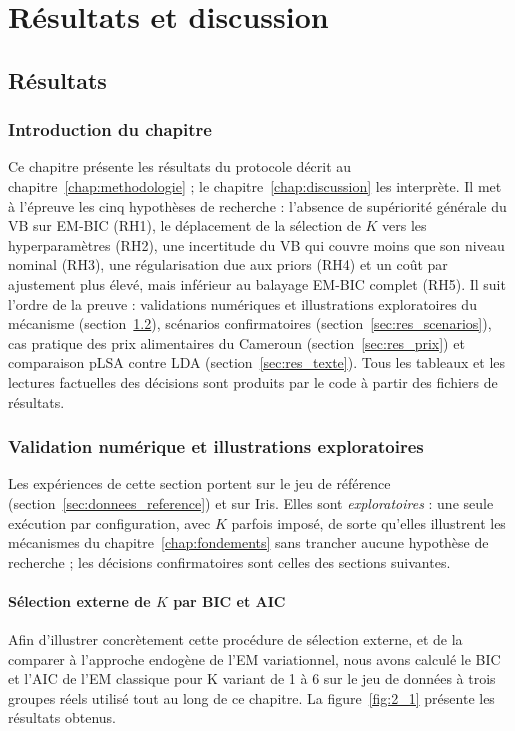 \part{Résultats et discussion}

\chapter{Résultats}\label{chap:resultats}
\section{Introduction du chapitre}\label{sec:intro_resultats}
Ce chapitre présente les résultats du protocole décrit au chapitre~\ref{chap:methodologie} ; le chapitre~\ref{chap:discussion} les interprète. Il met à l'épreuve les cinq hypothèses de recherche : l'absence de supériorité générale du VB sur EM-BIC (RH1), le déplacement de la sélection de $K$ vers les hyperparamètres (RH2), une incertitude du VB qui couvre moins que son niveau nominal (RH3), une régularisation due aux priors (RH4) et un coût par ajustement plus élevé, mais inférieur au balayage EM-BIC complet (RH5). Il suit l'ordre de la preuve : validations numériques et illustrations exploratoires du mécanisme (section~\ref{sec:res_illustrations}), scénarios confirmatoires (section~\ref{sec:res_scenarios}), cas pratique des prix alimentaires du Cameroun (section~\ref{sec:res_prix}) et comparaison pLSA contre LDA (section~\ref{sec:res_texte}). Tous les tableaux et les lectures factuelles des décisions sont produits par le code à partir des fichiers de résultats.

\section{Validation numérique et illustrations exploratoires}\label{sec:res_illustrations}
Les expériences de cette section portent sur le jeu de référence (section~\ref{sec:donnees_reference}) et sur Iris. Elles sont \emph{exploratoires} : une seule exécution par configuration, avec $K$ parfois imposé, de sorte qu'elles illustrent les mécanismes du chapitre~\ref{chap:fondements} sans trancher aucune hypothèse de recherche ; les décisions confirmatoires sont celles des sections suivantes.


\subsection{Sélection externe de $K$ par BIC et AIC}\label{sec:res_bic}
Afin d'illustrer concrètement cette procédure de sélection externe, et de la comparer à l'approche endogène de l'EM variationnel, nous avons calculé le BIC et l'AIC de l'EM classique pour K variant de 1 à 6 sur le jeu de données à trois groupes réels utilisé tout au long de ce chapitre. La figure~\ref{fig:2_1} présente les résultats obtenus.


